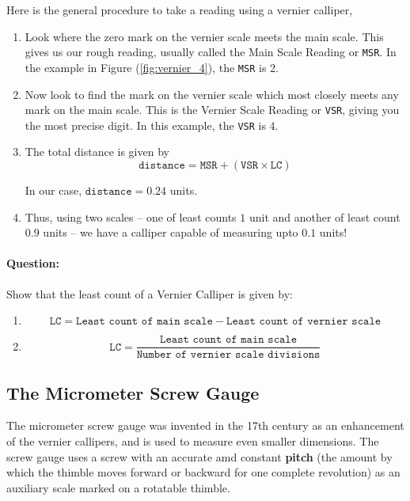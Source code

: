 Here is the general procedure to take a reading using a vernier calliper,

\begin{enumerate}
    \item Look where the zero mark on the vernier scale meets the main scale. This gives us our rough reading, usually called the Main Scale Reading or \texttt{MSR}. In the example in Figure (\ref{fig:vernier_4}), the \texttt{MSR} is 2.
    
    \item Now look to find the mark on the vernier scale which most closely meets any mark on the main scale. This is the Vernier Scale Reading or \texttt{VSR}, giving you the most precise digit. In this example, the \texttt{VSR} is 4.
    
    \item The total distance is given by 
    $$\texttt{distance} = \texttt{MSR} + \left(\texttt{VSR}\times\texttt{LC}\right)$$
    
    In our case, $\texttt{distance} = 0.24$ units.
    
    \item Thus, using two scales -- one of least counts $1$ unit and another of least count $0.9$ units -- we have a calliper capable of measuring upto $0.1$ units!
\end{enumerate}

\begin{question}
\paragraph{Question:} Show that the least count of a Vernier Calliper is given by:
\begin{enumerate}
    \item $$\texttt{LC} = \texttt{Least count of main scale} - \texttt{Least count of vernier scale}$$
    \item $$\texttt{LC} = \frac{\texttt{Least count of main scale}}{\texttt{Number of vernier scale divisions}}$$
\end{enumerate}
\end{question}

\subsection{The Micrometer Screw Gauge}

The micrometer screw gauge was invented in the 17th century as an enhancement of the vernier callipers, and is used to measure even smaller dimensions. The screw gauge uses a screw with an accurate amd constant \textbf{pitch} (the amount by which the thimble moves forward or backward for one complete revolution) as an auxiliary scale marked on a rotatable thimble.  

